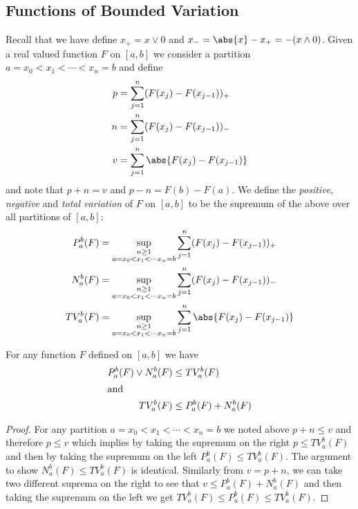 \subsection{Functions of Bounded Variation}
Recall that we have define $x_+ = x \vee 0$ and $x_- = \abs{x} -
x_+ = -(x \wedge 0)$.  Given a real valued function $F$ on $[a,b]$ we consider a partition $a=x_0
< x_1 < \dotsb < x_n=b$ and define 
\begin{align*}
p &= \sum_{j=1}^n (F(x_j) - F(x_{j-1}))_+ \\
n &= \sum_{j=1}^n (F(x_j) - F(x_{j-1}))_- \\
v &= \sum_{j=1}^n \abs{F(x_j) - F(x_{j-1})}\\
\end{align*}
and note that $p+n = v$ and $p - n = F(b) - F(a)$.  We define the
\emph{positive}, \emph{negative} and \emph{total variation} of $F$ on
$[a,b]$ to be the supremum of the above over all partitions of
$[a,b]$:
\begin{align*}
P_a^b(F) &= \sup_{\substack{n \geq 1 \\ a=x_0 < x_1 < \dotsb x_n=b}} \sum_{j=1}^n (F(x_j) - F(x_{j-1}))_+ \\
N_a^b(F) &= \sup_{\substack{n \geq 1 \\ a=x_0 < x_1 < \dotsb x_n=b}} \sum_{j=1}^n (F(x_j) - F(x_{j-1}))_- \\
TV_a^b(F) &= \sup_{\substack{n \geq 1 \\ a=x_0 < x_1 < \dotsb x_n=b}} \sum_{j=1}^n \abs{F(x_j) - F(x_{j-1})}\\
\end{align*}


\begin{lem}\label{ElementaryVariationInequalities}For any function $F$ defined on $[a,b]$ we have 
\begin{align*}
P_a^b(F) \vee N_a^b(F) &\leq TV_a^b(F) \\
\intertext{and}
TV_a^b(F) &\leq P_a^b(F) + N_a^b(F)
\end{align*}
\end{lem}
\begin{proof}
For any partition $a=x_0 < x_1 < \dotsb < x_n=b$ we noted above $p + n
\leq v$ and therefore $p \leq v$ which implies by taking the supremum on
the right $p \leq TV_a^b(F)$ and then by taking the supremum on the
left $P_a^b(F) \leq TV_a^b(F)$.  The argument to show $N_a^b(F) \leq
TV_a^b(F)$ is identical.  Similarly from $v = p + n$, we can take two
different suprema on the right to see that $v \leq P_a^b(F) +
N_a^b(F)$ and then taking the supremum on the left we get $TV_a^b(F)
\leq P_a^b(F) \leq TV_a^b(F)$.
\end{proof}

